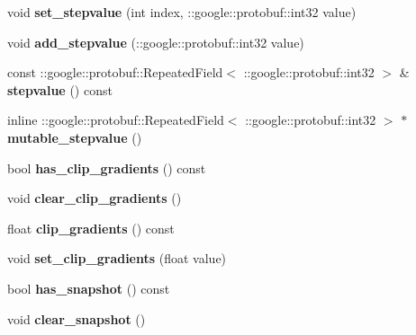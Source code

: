 \begin{DoxyCompactItemize}
void {\bfseries set\+\_\+stepvalue} (int index, \+::google\+::protobuf\+::int32 value)
\item 
\mbox{\label{classcaffe_1_1_solver_parameter_aeff64dfb4acef425f23cb3273af31eb8}} 
void {\bfseries add\+\_\+stepvalue} (\+::google\+::protobuf\+::int32 value)
\item 
\mbox{\label{classcaffe_1_1_solver_parameter_a66ded85f256541f0569b257e98315478}} 
const \+::google\+::protobuf\+::\+Repeated\+Field$<$ \+::google\+::protobuf\+::int32 $>$ \& {\bfseries stepvalue} () const
\item 
\mbox{\label{classcaffe_1_1_solver_parameter_a6d0f6e28469a5d7bcc669249ba52bd0c}} 
inline \+::google\+::protobuf\+::\+Repeated\+Field$<$ \+::google\+::protobuf\+::int32 $>$ $\ast$ {\bfseries mutable\+\_\+stepvalue} ()
\item 
\mbox{\label{classcaffe_1_1_solver_parameter_a3d6f97ba8d4e920bef781400c6e84162}} 
bool {\bfseries has\+\_\+clip\+\_\+gradients} () const
\item 
\mbox{\label{classcaffe_1_1_solver_parameter_a4fc718dc9480ba25190f394543cb4c56}} 
void {\bfseries clear\+\_\+clip\+\_\+gradients} ()
\item 
\mbox{\label{classcaffe_1_1_solver_parameter_ad50b2dfd627b1952f06eb4389348b32d}} 
float {\bfseries clip\+\_\+gradients} () const
\item 
\mbox{\label{classcaffe_1_1_solver_parameter_ab4944f2b075d6768172b639887f5b32f}} 
void {\bfseries set\+\_\+clip\+\_\+gradients} (float value)
\item 
\mbox{\label{classcaffe_1_1_solver_parameter_ad5b499c6ef6878d1f7311a9406e4604c}} 
bool {\bfseries has\+\_\+snapshot} () const
\item 
\mbox{\label{classcaffe_1_1_solver_parameter_a56523ce7b8eda09b04152571931837f0}} 
void {\bfseries clear\+\_\+snapshot} ()
\item 

\end{DoxyCompactItemize}
